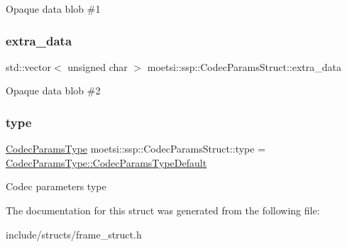 Opaque data blob \#1 \mbox{\label{structmoetsi_1_1ssp_1_1CodecParamsStruct_a709ed326f505393910eece3dc6887605}} 
\subsubsection{\texorpdfstring{extra\+\_\+data}{extra\_data}}
{\footnotesize\ttfamily std\+::vector$<$ unsigned char $>$ moetsi\+::ssp\+::\+Codec\+Params\+Struct\+::extra\+\_\+data}

Opaque data blob \#2 \mbox{\label{structmoetsi_1_1ssp_1_1CodecParamsStruct_a94a427a8907bb5a23c4f6ee2117a4803}} 
\subsubsection{\texorpdfstring{type}{type}}
{\footnotesize\ttfamily \hyperlink{namespacemoetsi_1_1ssp_a6d638ba0bd38e9daded08f633d893563}{Codec\+Params\+Type} moetsi\+::ssp\+::\+Codec\+Params\+Struct\+::type = \hyperlink{namespacemoetsi_1_1ssp_a6d638ba0bd38e9daded08f633d893563a1ffd3a6c06641b95d3e5142403ed0730}{Codec\+Params\+Type\+::\+Codec\+Params\+Type\+Default}}

Codec parameters type 

The documentation for this struct was generated from the following file\+:\begin{DoxyCompactItemize}
\item 
include/structs/frame\+\_\+struct.\+h\end{DoxyCompactItemize}
